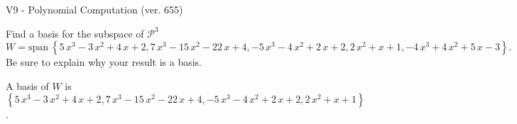 \begin{exercise}
  \begin{exerciseTitle}V9 - Polynomial Computation (ver. 655)\end{exerciseTitle}
  \begin{exerciseStatement}
    Find a basis for the subspace of \(\mathcal{P}^3\) 
\[W=\mathrm{span}\ \left\{5 \, x^{3} - 3 \, x^{2} + 4 \, x + 2 , 7 \, x^{3} - 15 \, x^{2} - 22 \, x + 4 , -5 \, x^{3} - 4 \, x^{2} + 2 \, x + 2 , 2 \, x^{2} + x + 1 , -4 \, x^{3} + 4 \, x^{2} + 5 \, x - 3\right\}.\]
 Be sure to explain why your result is a basis.


  \end{exerciseStatement}
  \begin{exerciseAnswer}
   A basis of \(W\) is  \(\left\{5 \, x^{3} - 3 \, x^{2} + 4 \, x + 2 , 7 \, x^{3} - 15 \, x^{2} - 22 \, x + 4 , -5 \, x^{3} - 4 \, x^{2} + 2 \, x + 2 , 2 \, x^{2} + x + 1\right\}\).
  


  \end{exerciseAnswer}
\end{exercise}